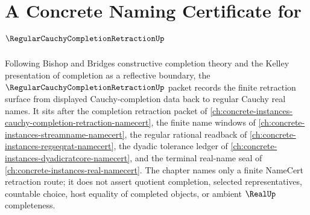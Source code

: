 \chapter{A Concrete Naming Certificate for $\RegularCauchyCompletionRetractionUp$}
\label{ch:concrete-instances-regular-cauchy-completion-retraction-namecert}

Following Bishop and Bridges constructive completion theory and the Kelley presentation of completion as a reflective boundary, the $\RegularCauchyCompletionRetractionUp$ packet records the finite retraction surface from displayed Cauchy-completion data back to regular Cauchy real names. It sits after the completion retraction packet of \autoref{ch:concrete-instances-cauchy-completion-retraction-namecert}, the finite name windows of \autoref{ch:concrete-instances-streamname-namecert}, the regular rational readback of \autoref{ch:concrete-instances-regseqrat-namecert}, the dyadic tolerance ledger of \autoref{ch:concrete-instances-dyadicratcore-namecert}, and the terminal real-name seal of \autoref{ch:concrete-instances-real-namecert}. The chapter names only a finite NameCert retraction route; it does not assert quotient completion, selected representatives, countable choice, host equality of completed objects, or ambient $\RealUp$ completeness.

